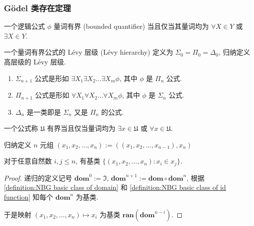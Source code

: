\subsubsection{Gödel 类存在定理}

\begin{definition}[Lévy 层级]
    \label {definition:Lévy hierarchy}
    一个逻辑公式 \(\phi\) 量词有界 (bounded quantifier) 当且仅当其量词均为 \(\forall X \in Y\) 或 \(\exists X \in Y\).

    一个量词有界公式的 Lévy 层级 (Lévy hierarchy) 定义为 \(\Sigma_0 = \Pi_0 = \Delta_0\), 归纳定义高层级的 Lévy 层级.

    \begin{enumerate}
        \item \(\Sigma_{n + 1}\) 公式是形如 \(\exists X_1 \exists X_2 \dots \exists X_m \phi\), 其中 \(\phi\) 是 \(\Pi_n\) 公式.
        \item \(\Pi_{n + 1}\) 公式是形如 \(\forall X_1 \forall X_2 \dots \forall X_m \phi\), 其中 \(\phi\) 是 \(\Sigma_n\) 公式.
        \item \(\Delta_{n}\) 是一类即是 \(\Sigma_n\) 又是 \(\Pi_n\) 的公式.
    \end{enumerate}
\end{definition}

\begin{definition}
    一个公式称 \(\mathfrak{U}\) 有界当且仅当量词均为 \(\exists x \in \mathfrak{U}\) 或 \(\forall x \in \mathfrak{U}\).
\end{definition}

\begin{definition}
    归纳定义 \(n\) 元组 \((x_1, x_2, \dots, x_n) := ((x_1, x_2, \dots, x_{n-1}),x_n)\)
\end{definition}

\begin{lemma}
    对于任意自然数 \(i,j \le n\), 有基类 \(\{(x_1, x_2, \dots ,x_n) : x_i \in x_j\}\).

    \begin{proof}
        递归的定义记号 \(\mathbf{dom}^0 := \mathfrak{I}\), \(\mathbf{dom}^{n+1} := \mathbf{dom} \circ \mathbf{dom}^n\),
        根据 \ref{definition:NBG basic class of domain} 和 \ref{definition:NBG basic class of id function} 知每个 \(\mathbf{dom}^n\) 为基类.

        于是映射 \((x_1, x_2, \dots, x_n) \mapsto x_i\) 为基类 \(\mathbf{ran} (\mathbf{dom}^{n-i})\).
    \end{proof}
\end{lemma}

